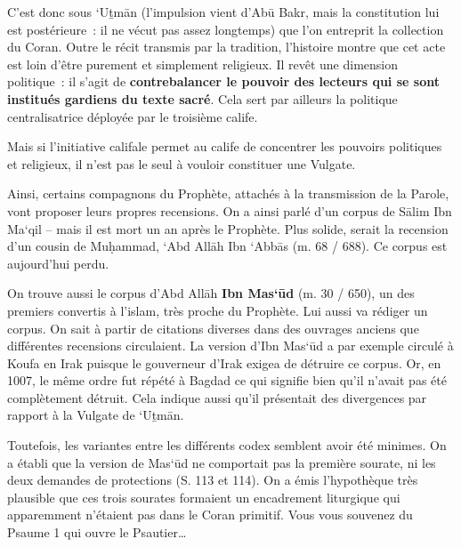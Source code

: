 C'est donc sous `Uṯmān (l'impulsion vient d'Abū Bakr, mais la
constitution lui est postérieure~: il ne vécut pas assez longtemps) que
l'on entreprit la collection du Coran. Outre le récit transmis par la
tradition, l'histoire montre que cet acte est loin d'être purement et
simplement religieux. Il revêt une dimension politique~: il s'agit de
\textbf{contrebalancer le pouvoir des lecteurs qui se sont institués
gardiens du texte sacré}. Cela sert par ailleurs la politique
centralisatrice déployée par le troisième calife.

Mais si l'initiative califale permet au calife de concentrer les
pouvoirs politiques et religieux, il n'est pas le seul à vouloir
constituer une Vulgate.


Ainsi, certains compagnons du Prophète, attachés à la transmission de la
Parole, vont proposer leurs propres recensions. On a ainsi parlé d'un
corpus de Sālim Ibn Ma`qil -- mais il est mort un an après le Prophète.
Plus solide, serait la recension d'un cousin de Muḥammad, `Abd Allāh Ibn
`Abbās (m. 68 / 688). Ce corpus est aujourd'hui perdu.


On trouve aussi le corpus d'Abd Allāh \textbf{Ibn Mas`ūd} (m. 30 / 650),
un des premiers convertis à l'islam, très proche du Prophète. Lui aussi
va rédiger un corpus. On sait à partir de citations diverses dans des
ouvrages anciens que différentes recensions circulaient. La version
d'Ibn Mas`ūd a par exemple circulé à Koufa en Irak puisque le gouverneur
d'Irak exigea de détruire ce corpus. Or, en 1007, le même ordre fut
répété à Bagdad ce qui signifie bien qu'il n'avait pas été complètement
détruit. Cela indique aussi qu'il présentait des divergences par rapport
à la Vulgate de `Uṯmān.

Toutefois, les variantes entre les différents codex semblent avoir été
minimes. On a établi que la version de Mas`ūd ne comportait pas la
première sourate, ni les deux demandes de protections (S. 113 et 114).
On a émis l'hypothèque très plausible que ces trois sourates formaient
un encadrement liturgique qui apparemment n'étaient pas dans le Coran
primitif. Vous vous souvenez du Psaume 1 qui ouvre le Psautier\ldots{}

